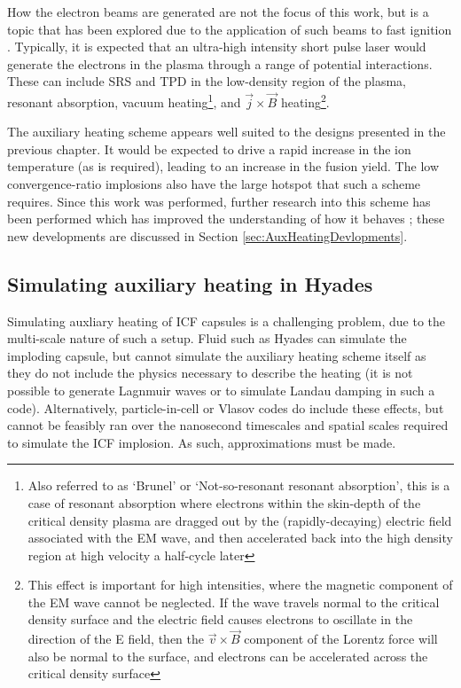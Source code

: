 How the electron beams are generated are not the focus of this work, but is a topic that has been explored  due to the application of such beams to fast ignition \cite{Tabak2005, Kemp2014}. Typically, it is expected that an ultra-high intensity short pulse laser would generate the electrons in the plasma through a range of potential interactions. These can include SRS and TPD in the low-density region of the plasma,  resonant absorption, vacuum heating\footnote{Also referred to as `Brunel' or `Not-so-resonant resonant absorption', this is a case of resonant absorption where electrons within the skin-depth of the critical density plasma are dragged out by the (rapidly-decaying) electric field associated with the EM wave, and then accelerated back into the high density region at high velocity a half-cycle later}, and $\vec{j} \times \vec{B}$ heating\footnote{This effect is important for high intensities, where the magnetic component of the EM wave cannot be neglected. If the wave travels normal to the critical density surface and the electric field causes electrons to oscillate in the direction of the E field, then the $\vec{v} \times \vec{B}$ component of the Lorentz force will also be normal to the surface, and electrons can be accelerated across the critical density surface}\cite{Wilks1997}.

The auxiliary heating scheme appears well suited to the designs presented in the previous chapter. It would be expected to drive a rapid increase in the ion temperature (as is required), leading to an increase in the fusion yield. The low convergence-ratio implosions also have the large hotspot that such a scheme requires. Since this work was performed, further research into this scheme has been performed which has improved the understanding of how it behaves \cite{Lee2023}; these new developments are discussed in Section \ref{sec:AuxHeatingDevlopments}.

\subsection{Simulating auxiliary heating in Hyades}

Simulating auxliary heating of ICF capsules is a challenging problem, due to the multi-scale nature of such a setup. Fluid such as Hyades can simulate the imploding capsule, but cannot simulate the auxiliary heating scheme itself as they do not include the physics necessary to describe the heating (it is not possible to generate Lagnmuir waves or to simulate Landau damping in such a code). Alternatively, particle-in-cell or Vlasov codes do include these effects, but cannot be feasibly ran over the nanosecond timescales and spatial scales required to simulate the ICF implosion. As such, approximations must be made.

